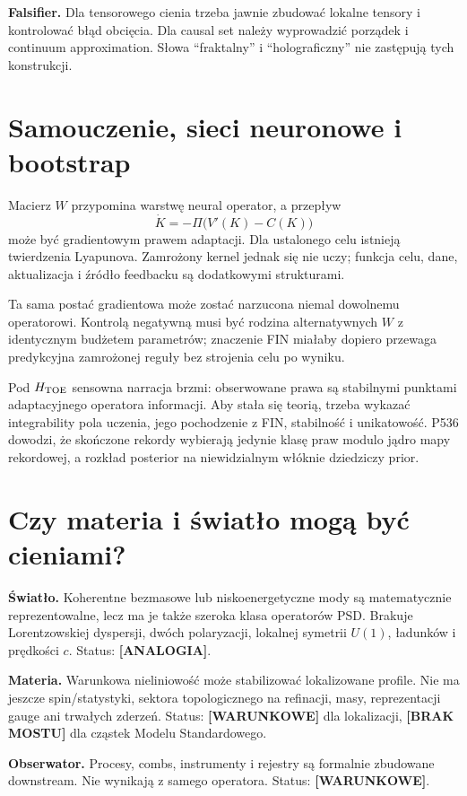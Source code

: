 \documentclass[11pt,a4paper]{article}
\newcommand{\conditional}{\textcolor{black!60}{\textbf{[WARUNKOWE]}}}
\newcommand{\analogy}{\textcolor{orange!85!black}{\textbf{[ANALOGIA]}}}
\newcommand{\absent}{\textcolor{red!72!black}{\textbf{[BRAK MOSTU]}}}
\begin{document}
\textbf{Falsifier.} Dla tensorowego cienia trzeba jawnie zbudować lokalne tensory i kontrolować błąd obcięcia. Dla causal set należy wyprowadzić porządek i continuum approximation. Słowa ``fraktalny'' i ``holograficzny'' nie zastępują tych konstrukcji.

\section{Samouczenie, sieci neuronowe i bootstrap}

Macierz $W$ przypomina warstwę neural operator, a przepływ
\[
\dot K=-\Pi\bigl(V'(K)-C(K)\bigr)
\]
może być gradientowym prawem adaptacji. Dla ustalonego celu istnieją twierdzenia Lyapunova. Zamrożony kernel jednak się nie uczy; funkcja celu, dane, aktualizacja i źródło feedbacku są dodatkowymi strukturami.

Ta sama postać gradientowa może zostać narzucona niemal dowolnemu operatorowi. Kontrolą negatywną musi być rodzina alternatywnych $W$ z identycznym budżetem parametrów; znaczenie FIN miałaby dopiero przewaga predykcyjna zamrożonej reguły bez strojenia celu po wyniku.

Pod $H_{\rm TOE}$ sensowna narracja brzmi: obserwowane prawa są stabilnymi punktami adaptacyjnego operatora informacji. Aby stała się teorią, trzeba wykazać integrability pola uczenia, jego pochodzenie z FIN, stabilność i unikatowość. P536 dowodzi, że skończone rekordy wybierają jedynie klasę praw modulo jądro mapy rekordowej, a rozkład posterior na niewidzialnym włóknie dziedziczy prior.

\section{Czy materia i światło mogą być cieniami?}

\textbf{Światło.} Koherentne bezmasowe lub niskoenergetyczne mody są matematycznie reprezentowalne, lecz ma je także szeroka klasa operatorów PSD. Brakuje Lorentzowskiej dyspersji, dwóch polaryzacji, lokalnej symetrii $U(1)$, ładunków i prędkości $c$. Status: \analogy{}.

\textbf{Materia.} Warunkowa nieliniowość może stabilizować lokalizowane profile. Nie ma jeszcze spin/statystyki, sektora topologicznego na refinacji, masy, reprezentacji gauge ani trwałych zderzeń. Status: \conditional{} dla lokalizacji, \absent{} dla cząstek Modelu Standardowego.

\textbf{Obserwator.} Procesy, combs, instrumenty i rejestry są formalnie zbudowane downstream. Nie wynikają z samego operatora. Status: \conditional{}.
\end{document}
